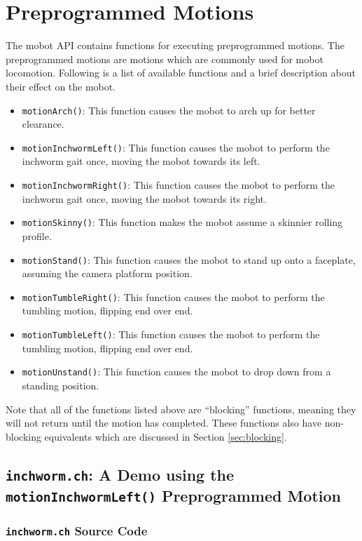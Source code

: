 \documentclass{article}
\begin{document}
\section{\label{sec:preprogrammed_motions}Preprogrammed Motions}
The mobot API contains functions for executing preprogrammed motions. The 
preprogrammed motions are motions which are commonly used for mobot locomotion.
Following is a list of available functions and a brief description about
their effect on the mobot.
\begin{itemize}
\item \texttt{motionArch()}: This function causes the mobot to arch up for better 
clearance.
\item \texttt{motionInchwormLeft()}: This function causes the mobot to perform
  the inchworm gait once, moving the mobot towards its left.
\item \texttt{motionInchwormRight()}: This function causes the mobot to perform
  the inchworm gait once, moving the mobot towards its right.
\item \texttt{motionSkinny()}: This function makes the mobot assume a skinnier
rolling profile.
\item \texttt{motionStand()}: This function causes the mobot to stand up onto a 
  faceplate, assuming the camera platform position.
\item \texttt{motionTumbleRight()}: This function causes the mobot to perform the
tumbling motion, flipping end over end.
\item \texttt{motionTumbleLeft()}: This function causes the mobot to perform the
tumbling motion, flipping end over end.
\item \texttt{motionUnstand()}: This function causes the mobot to drop down from a standing position.
\end{itemize}

Note that all of the functions listed above are ``blocking'' functions, meaning
they will not return until the motion has completed. These functions also
have non-blocking equivalents which are discussed in Section
\ref{sec:blocking}.

\subsection{\texttt{inchworm.ch}: A Demo using the \texttt{motionInchwormLeft()}
Preprogrammed Motion}
\subsubsection{\texttt{inchworm.ch} Source Code}

\end{document}

